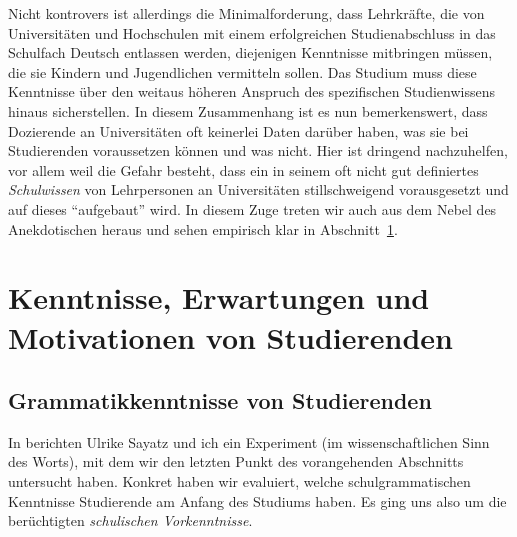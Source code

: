 Nicht kontrovers ist allerdings die Minimalforderung, dass Lehrkräfte, die von Universitäten und Hochschulen mit einem erfolgreichen Studienabschluss in das Schulfach Deutsch entlassen werden, diejenigen Kenntnisse mitbringen müssen, die sie Kindern und Jugendlichen vermitteln sollen.
Das Studium muss diese Kenntnisse über den weitaus höheren Anspruch des spezifischen Studienwissens hinaus sicherstellen.
In diesem Zusammenhang ist es nun bemerkenswert, dass Dozierende an Universitäten oft keinerlei Daten darüber haben, was sie bei Studierenden voraussetzen können und was nicht.
Hier ist dringend nachzuhelfen, vor allem weil die Gefahr besteht, dass ein in seinem oft nicht gut definiertes \textit{Schulwissen} von Lehrpersonen an Universitäten stillschweigend vorausgesetzt und auf dieses "`aufgebaut"' wird.
In diesem Zuge treten wir auch aus dem Nebel des Anekdotischen heraus und sehen empirisch klar in Abschnitt~\ref{sec:kenntnisseerwartungenundmotivationvonstudierenden}.


\section{Kenntnisse, Erwartungen und Motivationen von Studierenden}
\label{sec:kenntnisseerwartungenundmotivationvonstudierenden}

\subsection{Grammatikkenntnisse von Studierenden}
\label{sec:grammatikkentnissevonstudierenden}

In \citet{SchaeferSayatz2017a} berichten Ulrike Sayatz und ich ein Experiment (im wissenschaftlichen Sinn des Worts), mit dem wir den letzten Punkt des vorangehenden Abschnitts untersucht haben.
Konkret haben wir evaluiert, welche schulgrammatischen Kenntnisse Studierende am Anfang des Studiums haben.
Es ging uns also um die berüchtigten \textit{schulischen Vorkenntnisse}.

